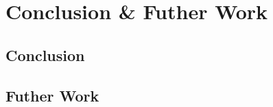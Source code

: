 \chapter{Conclusion \& Futher Work}
\label{ch:conclusion}

\section{Conclusion}

\section{Futher Work}
